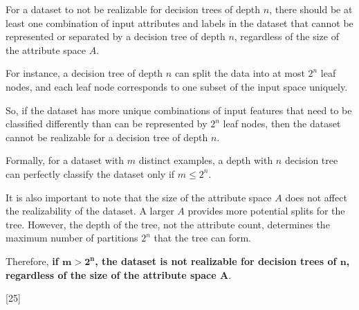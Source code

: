 \documentclass[12pt,letterpaper, onecolumn]{exam}
\begin{document}
\begin{questions}
\begin{parts}
      \begin{solution}

        For a dataset to not be realizable for decision trees of depth $n$,
        there should be at least one combination of input attributes and labels 
        in the dataset that cannot be represented or separated by a decision tree 
        of depth $n$, regardless of the size of the attribute space $A$.

        For instance, a decision tree of depth $n$ can split the data into at most $2^n$
        leaf nodes, and each leaf node corresponds to one subset of the input space uniquely.

        So, if the dataset has more unique combinations of input features that 
        need to be classified differently than can be represented by $2^n$ leaf nodes,
        then the dataset cannot be realizable for a decision tree of depth $n$.

        Formally, for a dataset with $m$ distinct examples, a depth with $n$
        decision tree can perfectly classify the dataset only if $m \leq 2^n$.

        It is also important to note that the size of the attribute space $A$ does 
        not affect the realizability of the dataset. A larger $A$ provides more potential 
        splits for the tree. However, the depth of the tree, not the attribute count, 
        determines the maximum number of partitions $2^n$ that the tree can form.

        Therefore, \textbf{if $\boldsymbol{m > 2^n}$, the dataset is not realizable for decision trees of $\boldsymbol{n}$,
        regardless of the size of the attribute space $\boldsymbol{A}$}.
      
      \end{solution}
      
    \end{parts}

    \pagebreak

    [25]

\end{questions}
\end{document}

